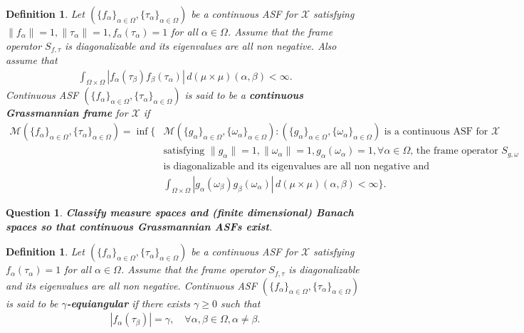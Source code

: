 \documentclass{amsart}
\newtheorem{definition}[theorem]{Definition}
\newtheorem{question}[theorem]{Question}
\begin{document}
 \begin{definition}\label{CONTINUOUSGRASSMANNIANDEFINITION}
 	Let  $ (\{f_\alpha\}_{\alpha\in \Omega}, \{\tau_\alpha\}_{\alpha\in \Omega}) $ be a continuous ASF for $\mathcal{X}$ satisfying $\|f_\alpha\|=1, \|\tau_\alpha\|=1, f_\alpha(\tau_\alpha)=1$ for all $\alpha \in \Omega$. Assume that  the  frame operator 
 	$	S_{f, \tau}$  is diagonalizable and its eigenvalues are all non negative. Also assume that 
 	\begin{align*}
 		\int_{\Omega\times\Omega}|f_\alpha(\tau_\beta)f_\beta(\tau_\alpha)|\, d(\mu\times\mu)(\alpha,\beta)<\infty.
 	\end{align*} 
  Continuous  ASF $ (\{f_\alpha\}_{\alpha\in \Omega}, \{\tau_\alpha\}_{\alpha\in \Omega}) $ is said to be a \textbf{continuous Grassmannian frame} for  $\mathcal{X}$ if 
 	\begin{align*}
 		\mathcal{M}(\{f_\alpha\}_{\alpha\in \Omega}, \{\tau_\alpha\}_{\alpha\in \Omega})=\inf\bigg\{&\mathcal{M}(\{g_\alpha\}_{\alpha\in \Omega}, \{\omega_\alpha\}_{\alpha\in \Omega}): (\{g_\alpha\}_{\alpha\in \Omega}, \{\omega_\alpha\}_{\alpha\in \Omega}) \text{ is a continuous  ASF for }\mathcal{X}  \\
 		& \text{satisfying } \|g_\alpha\|=1, \|\omega_\alpha\|=1, g_\alpha(\omega_\alpha)=1, \forall \alpha \in \Omega \text{, the frame operator }  S_{g,\omega}\\
 		& \text{is diagonalizable and its eigenvalues are all non negative and }\\
 		&	\int_{\Omega\times\Omega}|g_\alpha(\omega_\beta)g_\beta(\omega_\alpha)|\, d(\mu\times\mu)(\alpha,\beta)<\infty\bigg\}.		
 	\end{align*}		
 \end{definition}
 \begin{question}
	\textbf{Classify measure spaces and (finite dimensional) Banach spaces so that continuous Grassmannian ASFs exist}.
\end{question}
\begin{definition}
 Let  $ (\{f_\alpha\}_{\alpha\in \Omega}, \{\tau_\alpha\}_{\alpha\in \Omega}) $ be a continuous ASF for $\mathcal{X}$ satisfying $f_\alpha(\tau_\alpha)=1$ for all $\alpha \in \Omega$. Assume that  the  frame operator 
 $	S_{f, \tau}$  is diagonalizable and its eigenvalues are all non negative. Continuous  ASF $ (\{f_\alpha\}_{\alpha\in \Omega}, \{\tau_\alpha\}_{\alpha\in \Omega}) $ is said to be 	\textbf{$\gamma$-equiangular} if there exists $\gamma\geq0$ such that
 	\begin{align*}
 		|f_\alpha(\tau_\beta)|=\gamma, \quad \forall  \alpha, \beta \in \Omega, \alpha\neq \beta.
 	\end{align*}
 \end{definition}
\end{document}
